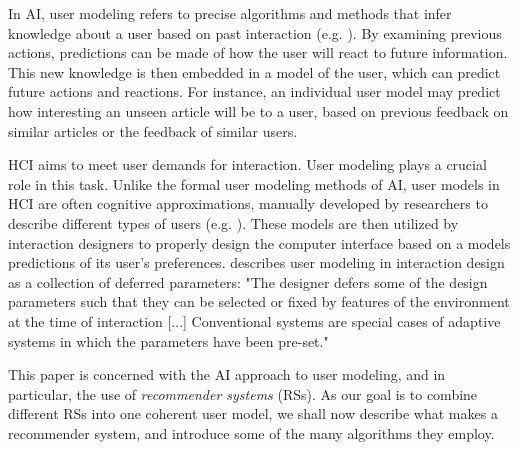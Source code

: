 In AI, user modeling refers to precise algorithms and methods that infer knowledge about a user based on past interaction 
(e.g. \cite{Pazzani2007, Smyth2007, Alshamri2008, Resnick1994}).
By examining previous actions, predictions can be made of how the user will react to future information. This new knowledge is then embedded in a model of the user, which can predict future actions and reactions. 
For instance, an individual user model may predict how interesting an unseen article will be to a user, based on previous feedback on similar articles or the feedback of similar users.

HCI aims to meet user demands for interaction. 
User modeling plays a crucial role in this task. 
Unlike the formal user modeling methods of AI, user models in HCI are often cognitive approximations, manually developed by researchers to describe different types of users 
(e.g. \cite{Fischer2001, Jameson2009, Cato2001}).
These models are then utilized by interaction designers to properly design the computer interface based on a models predictions of its user’s preferences.
\cite{Totterdell1990} describes user modeling in interaction design as a collection of deferred parameters: "The designer defers some of the design parameters such that they can be selected or fixed by features of the environment at the time of interaction [...] Conventional systems are special cases of adaptive systems in which the parameters have been pre-set."

This paper is concerned with the AI approach to user modeling, and in particular, the use of \emph{recommender systems} (RSs).
As our goal is to combine different RSs into one coherent user model, 
we shall now describe what makes a recommender system,
and introduce some of the many algorithms they employ.


